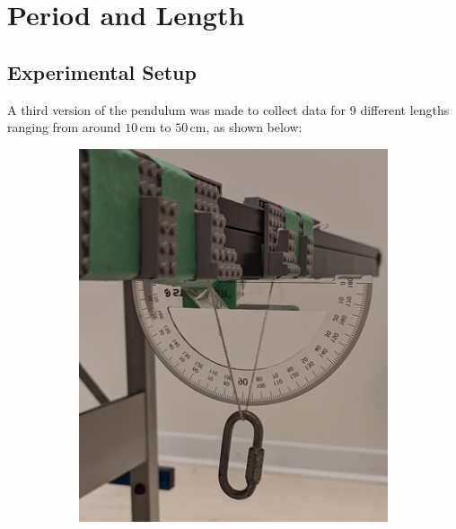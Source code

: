 \documentclass[12pt]{article}
\begin{document}
{\color{blue}

\section{Period and Length} \label{Period and Length}

\subsection{Experimental Setup}
A third version of the pendulum was made to collect data for 9 different lengths ranging from around $10\,$cm to $50\,$cm, as shown below:

\begin{figure}[!hptb]
    \centering
    \begin{subfigure}{0.49\textwidth}
        \centering
        \includegraphics[width=\textwidth]{../figures/exp_setup3_angle.png}
    \end{subfigure}
    \hfill
    \begin{subfigure}{0.49\textwidth}
        \centering

\end{subfigure}
\end{figure}}
\end{document}
